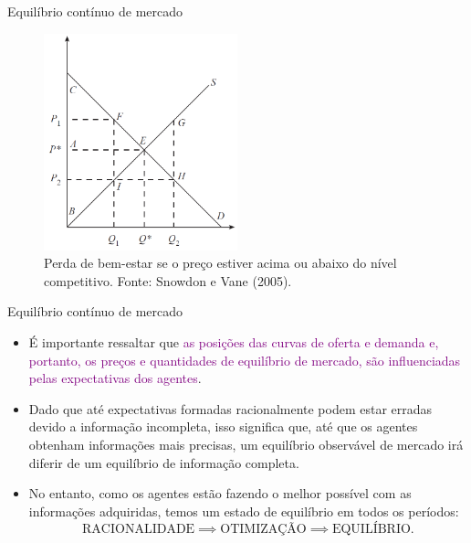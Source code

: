 \documentclass[10pt]{beamer}
\begin{document}
\begin{frame}{Equilíbrio contínuo de mercado}
    \begin{figure}
        \centering
        \includegraphics[width=0.5\textwidth]{./figures/aula11_fig8.PNG}
        \caption{Perda de bem-estar se o preço estiver acima ou abaixo do nível competitivo. Fonte: Snowdon e Vane (2005).}
        \label{fig5}
    \end{figure}
\end{frame}

\begin{frame}{Equilíbrio contínuo de mercado}
    \begin{itemize}
        \item É importante ressaltar que \textcolor{purple}{as posições das curvas de oferta e demanda e, portanto, os preços e quantidades de equilíbrio de mercado, são influenciadas pelas expectativas dos agentes}.
        \bigskip
        \item Dado que até expectativas formadas racionalmente podem estar erradas devido a informação incompleta, isso significa que, até que os agentes obtenham informações mais precisas, um equilíbrio observável de mercado irá diferir de um equilíbrio de informação completa.
        \bigskip
        \item No entanto, como os agentes estão fazendo o melhor possível com as informações adquiridas, temos um estado de equilíbrio em todos os períodos:
        \[
        \text{RACIONALIDADE} \implies \text{OTIMIZAÇÃO} \implies \text{EQUILÍBRIO}.
        \]
    \end{itemize}
\end{frame}
\end{document}
